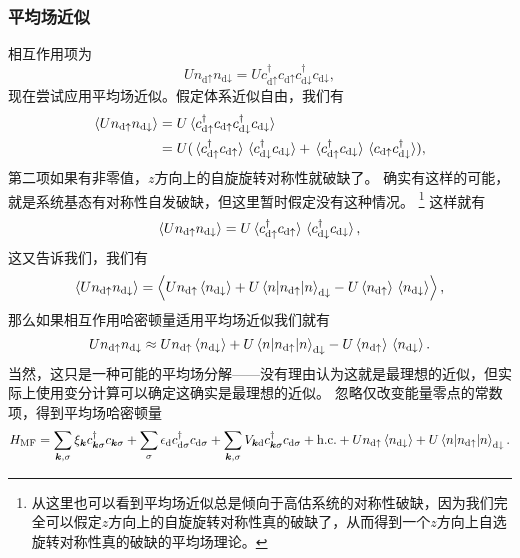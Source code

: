 \subsubsection{平均场近似}

相互作用项为
\[
    U {n}_{\text{d} \uparrow} {n}_{\text{d} \downarrow} = U {c}_{\text{d} \uparrow}^\dagger {c}_{\text{d} \uparrow} {c}^\dagger_{\text{d} \downarrow} {c}_{\text{d} \downarrow},
\]
现在尝试应用平均场近似。假定体系近似自由，我们有
\[
    \begin{aligned}
        \expval{U {n}_{\text{d} \uparrow} {n}_{\text{d} \downarrow}} &= U \expval*{{c}_{\text{d} \uparrow}^\dagger {c}_{\text{d} \uparrow} {c}^\dagger_{\text{d} \downarrow} {c}_{\text{d} \downarrow}} \\
        &= U ( \expval*{{c}_{\text{d} \uparrow}^\dagger {c}_{\text{d} \uparrow}} \expval*{{c}_{\text{d} \downarrow}^\dagger {c}_{\text{d} \downarrow}} + \expval*{{c}_{\text{d} \uparrow}^\dagger {c}_{\text{d} \downarrow}} \expval*{{c}_{\text{d} \uparrow} {c}^\dagger_{\text{d} \downarrow}} ),
    \end{aligned}
\]
第二项如果有非零值，$z$方向上的自旋旋转对称性就破缺了。
确实有这样的可能，就是系统基态有对称性自发破缺，但这里暂时假定没有这种情况。%
\footnote{从这里也可以看到平均场近似总是倾向于高估系统的对称性破缺，因为我们完全可以假定$z$方向上的自旋旋转对称性真的破缺了，从而得到一个$z$方向上自选旋转对称性真的破缺的平均场理论。
}%
这样就有
\[
    \expval{U {n}_{\text{d} \uparrow} {n}_{\text{d} \downarrow}} = U \expval*{{c}_{\text{d} \uparrow}^\dagger {c}_{\text{d} \uparrow}} \expval*{{c}_{\text{d} \downarrow}^\dagger {c}_{\text{d} \downarrow}},
\]
这又告诉我们，我们有
\[
    \expval{U {n}_{\text{d} \uparrow} {n}_{\text{d} \downarrow}} = \expval{ U {n}_{\text{d} \uparrow} \expval*{{n}_{\text{d} \downarrow}} + U \expval*{{n}_{\text{d} \uparrow}} {n}_{\text{d} \downarrow} - U \expval*{{n}_{\text{d} \uparrow}} \expval*{{n}_{\text{d} \downarrow}} },
\]
那么如果相互作用哈密顿量适用平均场近似我们就有
\begin{equation}
    U {n}_{\text{d} \uparrow} {n}_{\text{d} \downarrow} \approx U {n}_{\text{d} \uparrow} \expval*{{n}_{\text{d} \downarrow}} + U \expval*{{n}_{\text{d} \uparrow}} {n}_{\text{d} \downarrow} - U \expval*{{n}_{\text{d} \uparrow}} \expval*{{n}_{\text{d} \downarrow}}.
\end{equation}
当然，这只是一种可能的平均场分解——没有理由认为这就是最理想的近似，但实际上使用变分计算可以确定这确实是最理想的近似。
忽略仅改变能量零点的常数项，得到平均场哈密顿量
\begin{equation}
    {H}_\text{MF} = \sum_{\vb*{k}, \sigma} \xi_{\vb*{k}} {c}_{\vb*{k}\sigma}^\dagger {c}_{\vb*{k} \sigma} + \sum_\sigma \epsilon_\text{d} {c}_{\text{d}\sigma}^\dagger {c}_{\text{d} \sigma} + \sum_{\vb*{k}, \sigma} V_{\vb*{k} \text{d}} {c}_{\vb*{k} \sigma}^\dagger {c}_{\text{d} \sigma} + \text{h.c.} + U {n}_{\text{d} \uparrow} \expval*{{n}_{\text{d} \downarrow}} + U \expval*{{n}_{\text{d} \uparrow}} {n}_{\text{d} \downarrow}.
    \label{eq:anderson-mf}
\end{equation}
